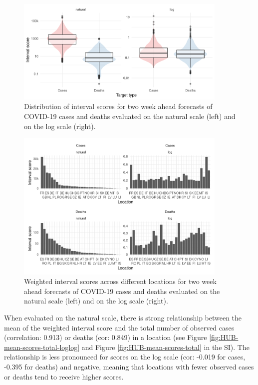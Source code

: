 \documentclass{article}
\begin{document}
\begin{figure}[h!]
    \centering
    \includegraphics[width=0.9\textwidth]{output/figures/HUB-average-scores.png}
    \caption{Distribution of interval scores for two week ahead forecasts of COVID-19 cases and deaths evaluated on the natural scale (left) and on the log scale (right). }
    \label{fig:HUB-average-scores}
\end{figure}

\begin{figure}[h!]
    \centering
    \includegraphics[width=0.9\textwidth]{output/figures/HUB-scores-locations.png}
    \caption{Weighted interval scores across different locations for two week ahead forecasts of COVID-19 cases and deaths evaluated on the natural scale (left) and on the log scale (right). }
    \label{fig:HUB-scores-location}
\end{figure}

When evaluated on the natural scale, there is  strong relationship between the mean of the weighted interval score and the total number of observed cases (correlation: 0.913) or deaths (cor: 0.849) in a location (see Figure \ref{fig:HUB-mean-scores-total-loglog} and Figure \ref{fig:HUB-mean-scores-total} in the SI). The relationship is less pronounced for scores on the log scale (cor: -0.019 for cases, -0.395 for deaths) and negative, meaning that locations with fewer observed cases or deaths tend to receive higher scores. 
\end{document}
